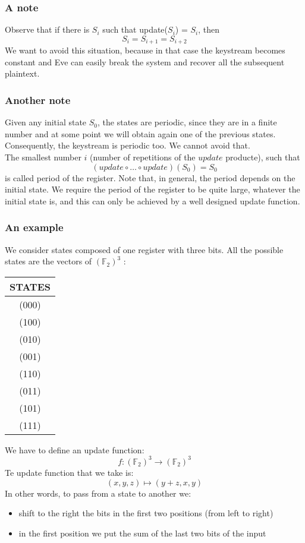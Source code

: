 \documentclass[a4paper, 10pt, titlepage]{article}
\begin{document}
\subsubsection*{A note}
Observe that if there is $S_i$ such that update($S_i$) = $S_i$, then
$$S_i = S_{i+1} = S_{i+2}$$
We want to avoid this situation, because in that case the keystream becomes constant and Eve can easily break the system and recover all the subsequent plaintext.
\subsubsection*{Another note}
Given any initial state $S_0$, the states are periodic, since they are in a finite number and at some point we will obtain again one of the previous states. Consequently, the keystream is periodic too. We cannot avoid that. \\
The smallest number $i$ (number of repetitions of the $update$ producte), such that
$$(update \circ \dots \circ update)(S_0) = S_0$$
is called period of the register. Note that, in general, the period depends on the initial state. We require the period of the register to be quite large, whatever the initial state is, and this can only be achieved by a well designed update function.

\subsubsection*{An example}
We consider states composed of one register with three bits. All the
possible states are the vectors of $(\mathbb{F}_2)^3$ :
\begin{center}
\begin{tabular}{|c|}
\hline
STATES \\ \hline
(000)\\
(100)\\
(010)\\
(001)\\
(110)\\
(011)\\
(101)\\
(111)\\
\hline
\end{tabular}
\end{center}
We have to define an update function:
$$f : (\mathbb{F}_2)^3 \rightarrow (\mathbb{F}_2)^3$$
Te update function that we take is:
$$(x, y, z) \mapsto (y + z,x ,y)$$
In other words, to pass from a state to another we:
\begin{itemize}
\item shift to the right the bits in the first two positions (from left to right)
\item in the first position we put the sum of the last two bits of the input
\end{itemize}
\end{document}
